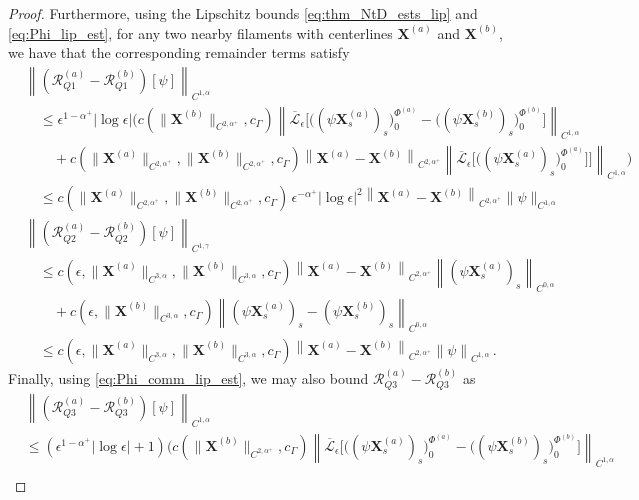\documentclass[11pt,reqno]{amsart}
\newcommand{\X}{\bm{X}}
\newcommand{\abs}[1]{\left\lvert #1 \right\rvert}
\newcommand{\norm}[1]{\left\lVert #1 \right\rVert}
\newcommand{\mc}[1]{\mathcal{#1}}
\theoremstyle{definition}
\begin{document}
\begin{proof}
Furthermore, using the Lipschitz bounds \eqref{eq:thm_NtD_ests_lip} and \eqref{eq:Phi_lip_est}, for any two nearby filaments with centerlines $\X^{(a)}$ and $\X^{(b)}$, we have that the corresponding remainder terms satisfy 
\begin{equation}
\begin{aligned}
  &\norm{(\mc{R}_{Q1}^{(a)}-\mc{R}_{Q1}^{(b)})[\psi]}_{C^{1,\alpha}} \\
  &\quad \le \epsilon^{1-\alpha^+}\abs{\log\epsilon}\bigg(c(\|\X^{(b)}\|_{C^{2,\alpha^+}},c_\Gamma)\norm{\overline{\mc{L}}_\epsilon\big[\big((\psi\X_s^{(a)})_s \big)_0^{\Phi^{(a)}}- \big((\psi\X_s^{(b)})_s \big)_0^{\Phi^{(b)}}\big]}_{C^{1,\alpha}}\\
  &\qquad + c(\|\X^{(a)}\|_{C^{2,\alpha^+}},\|\X^{(b)}\|_{C^{2,\alpha^+}},c_\Gamma)\norm{\X^{(a)}-\X^{(b)}}_{C^{2,\alpha^+}}\norm{\overline{\mc{L}}_\epsilon\big[\big((\psi\X_s^{(a)})_s \big)_0^{\Phi^{(a)}}\big]\big]}_{C^{1,\alpha}}\bigg) \\
  &\quad \le c(\|\X^{(a)}\|_{C^{2,\alpha^+}},\|\X^{(b)}\|_{C^{2,\alpha^+}},c_\Gamma)\, \epsilon^{-\alpha^+}\abs{\log\epsilon}^2\norm{\X^{(a)}-\X^{(b)}}_{C^{2,\alpha^+}}\|\psi\|_{C^{1,\alpha}}\\
%
%
  &\norm{(\mc{R}_{Q2}^{(a)}-\mc{R}_{Q2}^{(b)})[\psi]}_{C^{1,\gamma}} \\
  &\quad \le 
  c(\epsilon,\|\X^{(a)}\|_{C^{3,\alpha}},\|\X^{(b)}\|_{C^{3,\alpha}},c_\Gamma)\norm{\X^{(a)}-\X^{(b)}}_{C^{2,\alpha^+}}\norm{(\psi\X_s^{(a)})_s}_{C^{0,\alpha}} \\
  &\qquad + c(\epsilon,\|\X^{(b)}\|_{C^{3,\alpha}},c_\Gamma)\norm{(\psi\X_s^{(a)})_s- (\psi\X_s^{(b)})_s}_{C^{0,\alpha}}\\
  &\quad\le
  c(\epsilon,\|\X^{(a)}\|_{C^{3,\alpha}},\|\X^{(b)}\|_{C^{3,\alpha}},c_\Gamma)\norm{\X^{(a)}-\X^{(b)}}_{C^{2,\alpha^+}}\norm{\psi}_{C^{1,\alpha}}\,.
\end{aligned}
\end{equation}
%
Finally, using \eqref{eq:Phi_comm_lip_est}, we may also bound $\mc{R}_{Q3}^{(a)}-\mc{R}_{Q3}^{(b)}$ as 
\begin{equation}
\begin{aligned}
&\norm{(\mc{R}_{Q3}^{(a)}-\mc{R}_{Q3}^{(b)})[\psi]}_{C^{1,\alpha}}\\
&\le (\epsilon^{1-\alpha^+}\abs{\log\epsilon}+1)\bigg(
  c(\|\X^{(b)}\|_{C^{2,\alpha^+}},c_\Gamma)\norm{\overline{\mc{L}}_\epsilon\big[\big((\psi\X_s^{(a)})_s \big)_0^{\Phi^{(a)}} - \big((\psi\X_s^{(b)})_s \big)_0^{\Phi^{(b)}}\big]}_{C^{1,\alpha}} \\

\end{aligned}
\end{equation}
\end{proof}
\end{document}
